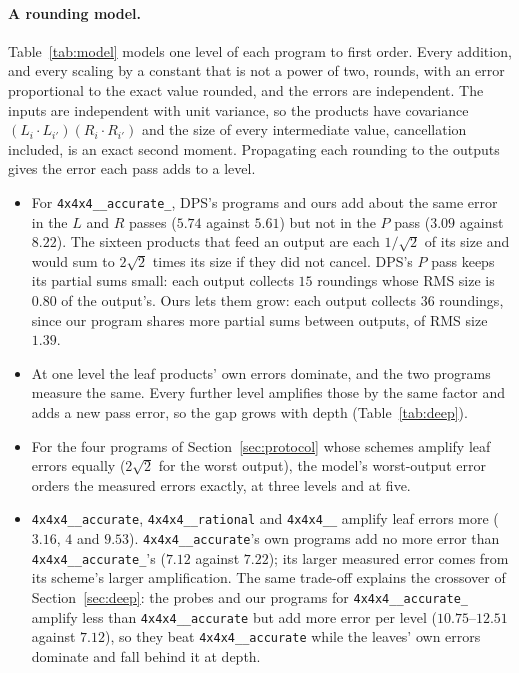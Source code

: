\documentclass[11pt]{article}
\theoremstyle{remark}
\newcommand{\acc}{\texttt{4x4x4\_\allowbreak 48\_\allowbreak accurate}\xspace}
\newcommand{\acct}{\texttt{4x4x4\_\allowbreak 48\_\allowbreak accurate\_\allowbreak 262}\xspace}
\newcommand{\rat}{\texttt{4x4x4\_\allowbreak 48\_\allowbreak rational}\xspace}
\newcommand{\pto}{\texttt{4x4x4\_\allowbreak 48\_\allowbreak 201}\xspace}
\begin{document}
\paragraph{A rounding model.}
Table~\ref{tab:model} models one level of each program to first order.
Every addition, and every scaling by a constant that is not a power of
two, rounds, with an error proportional to the exact value rounded, and
the errors are independent.  The inputs are independent with unit
variance, so the products have covariance
$(L_i\cdot L_{i'})(R_i\cdot R_{i'})$ and the size of every intermediate
value, cancellation included, is an exact second moment.  Propagating
each rounding to the outputs gives the error each pass adds to a level.
\begin{itemize}
\item For \acct, DPS's programs and ours add about the same error in the
  $L$ and $R$ passes ($5.74$ against $5.61$) but not in the $P$ pass
  ($3.09$ against $8.22$).  The sixteen products that feed an output
  are each $1/\sqrt2$ of its size and would sum to $2\sqrt2$ times its
  size if they did not cancel.  DPS's $P$ pass keeps its partial sums
  small: each output collects $15$ roundings whose RMS size is $0.80$ of
  the output's.  Ours lets them grow: each output collects $36$
  roundings, since our program shares more partial sums between
  outputs, of RMS size $1.39$.
\item At one level the leaf products' own errors dominate, and the two
  programs measure the same.  Every further level amplifies those by the
  same factor and adds a new pass error, so the gap grows with depth
  (Table~\ref{tab:deep}).
\item For the four programs of Section~\ref{sec:protocol} whose schemes
  amplify leaf errors equally ($2\sqrt2$ for the worst output), the
  model's worst-output error orders the measured errors exactly, at
  three levels and at five.
\item \acc, \rat and \pto amplify leaf errors more ($3.16$, $4$ and
  $9.53$).  \acc's own programs add no more error than \acct's ($7.12$
  against $7.22$); its larger measured error comes from its scheme's
  larger amplification.  The same trade-off explains the crossover of
  Section~\ref{sec:deep}: the probes and our programs for \acct amplify
  less than \acc but add more error per level ($10.75$--$12.51$ against
  $7.12$), so they beat \acc while the leaves' own errors dominate and
  fall behind it at depth.
\end{itemize}
\end{document}
